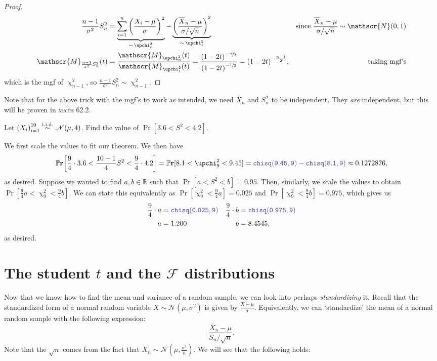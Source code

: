 \begin{proof}
\begin{align*}
        \frac{n-1}{\sigma^2} S_n^2 &= \underbrace{\sum_{i=1}^n {\bigg(\frac{X_i -\mu}{\sigma}\bigg)}^2}_{\sim\,\upchi_n^2}  -  \underbrace{{\bigg(\frac{\overline{X}_n -\mu}{\sigma/\sqrt{n}}\bigg)}^2}_{\sim\,\upchi_1^2} &\text{since}~\frac{\overline{X}_n - \mu}{\sigma/\sqrt{n}}\sim \mathscr{N}(0,1) \\ 
        \mathscr{M}_{\frac{n-1}{\sigma^2}S_n^2}(t) & = \frac{\mathscr{M}_{\upchi_n^2}(t)}{\mathscr{M}_{\upchi_1^2}(t)} = \frac{{(1-2t)}^{-\sfrac{n}{2}}}{{(1-2t)}^{-\sfrac{1}{2}}} = {(1-2t)}^{-\frac{n-1}{2}}, &\text{taking mgf's}
    \end{align*}which is the mgf of \(\upchi_{n-1}^2\), so \(\frac{n-1}{\sigma^2}S_n^2 \sim \upchi_{n-1}^2\). 
\end{proof}

Note that for the above trick with the mgf's to work as intended, we need \(\overline{X}_n\) and \(S_n^2\) to be independent. 
They \textit{are} independent, but this will be proven in \textsc{math} 62.2. 

\begin{example}
    Let \({(X_i)}_{i=1}^{10} \stackrel{\mathrm{i.i.d.}}{\sim} \mathscr{N}(\mu, 4)\). Find the value of \(\Pr[3.6 < S^2 <4.2]\). 

    We first scale the values to fit our theorem. We then have\[
    \Pr\bigg[\frac{9}{4} \cdot 3.6 < \frac{10-1}{4} S^2 < \frac{9}{4}\cdot 4.2\bigg] = \Pr[8.1 < \upchi_9^2 < 9.45] = \code{chisq(9.45,9)} - \code{chisq(8.1,9)} \approx 0.1272876,
    \]as desired. Suppose we wanted to find \(a,b\in\mathbb{R}\) such that \(\Pr[a<S^2<b] = 0.95\). 
    Then, similarly, we scale the values to obtain \(\Pr[\frac{9}{4} a < \upchi_9^2 <\frac{9}{4} b]\). 
    We can state this equivalently as \(\Pr[\upchi_9^2 < \frac{9}{4}a] = 0.025\) and \(\Pr[\upchi_9^2 < \frac{9}{4}b ] = 0.975\), which gives us\begin{align*}
        \frac{9}{4}\cdot a &= \code{chisq(0.025, 9)} & \frac{9}{4}\cdot b &= \code{chisq(0.975,9)} \\ 
        a & = 1.200 & b&= 8.4545,
    \end{align*}as desired. 
\end{example}

\section{The student \(t\) and the \(\mathscr{F}\) distributions}

Now that we know how to find the mean and variance of a random sample, we can look into perhaps \textit{standardizing} it. 
Recall that the standardized form of a normal random variable \(X\sim\mathscr{N}(\mu, \sigma^2)\) is given by \(\frac{X-\mu}{\sigma}\). 
Equivalently, we can `standardize' the mean of a normal random sample with the following expression:\[
    \frac{\overline{X}_n -\mu}{S_n/\sqrt{n}}. 
\]Note that the \(\sqrt{n}\) comes from the fact that \(\overline{X}_n\sim \mathscr{N}(\mu, \frac{\sigma^2}{n})\).
We will see that the following holds:

